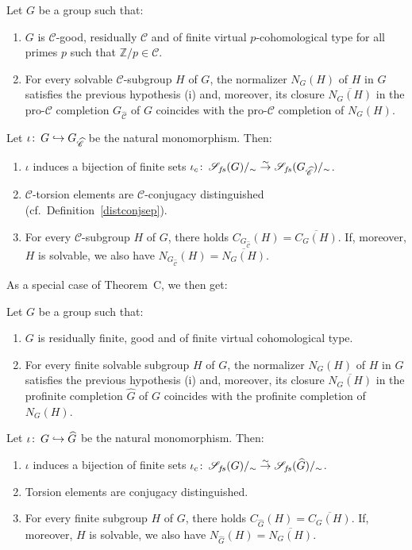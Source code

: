 \documentclass[12pt,twoside]{amsart}
\newcommand\Z{{\mathbb Z}}
\newcommand\hookra{\hookrightarrow}
\newcommand\sr{\stackrel}
\newcommand\ol{\overline}
\newcommand\cC{{\mathscr C}}
\newcommand\cS{{\mathscr S}}
\newcommand\hG{{\widehat{G}}}
\def\co{\colon\thinspace}
\def\wC{{\widehat{\cC}}}
\newenvironment{customtheorem}[1]
  {\renewcommand\theinnercustomthm{#1}\innercustomthm}
  {\endinnercustomthm}
\newenvironment{customcorollary}[1]
  {\renewcommand\theinnercustomcor{#1}\innercustomcor}
  {\endinnercustomcor}
\theoremstyle{definition}
\begin{document}
\begin{customtheorem}{C}Let $G$ be a group such that:
\begin{enumerate}
\item $G$ is $\cC$-good, residually $\cC$ and of finite virtual $p$-cohomological type for all primes $p$ such that $\Z/p\in\cC$.
\item For every solvable $\cC$-subgroup $H$ of $G$, the normalizer $N_G(H)$ of $H$ in $G$ satisfies the previous hypothesis (i)
and, moreover, its closure $\ol{N_G(H)}$ in the pro-$\cC$ completion $G_{\wC}$ of $G$ coincides with the pro-$\cC$
completion of $N_G(H)$.
\end{enumerate}
Let $\iota\co G\hookra G_{\wC}$ be the natural monomorphism. Then:
\begin{enumerate}
\item $\iota$ induces a bijection of finite sets $\iota_c\co\cS_{f\!s}(G)/_{\sim}\sr{\sim}{\to}\cS_{f\!s}(G_{\wC})/_{\sim}$. 
\item $\cC$-torsion elements are $\cC$-conjugacy distinguished (cf.\ Definition~\ref{distconjsep}).
\item For every $\cC$-subgroup $H$ of $G$, there holds $C_{G_\wC}(H)=\ol{C_G(H)}$. If, moreover, $H$ is solvable,
we also have $N_{G_\wC}(H)=\ol{N_G(H)}$.
\end{enumerate}
\end{customtheorem}

As a special case of Theorem~C, we then get:

\begin{customcorollary}{D}Let $G$ be a group such that:
\begin{enumerate}
\item $G$ is residually finite, good and of finite virtual cohomological type.
\item For every finite solvable subgroup $H$ of $G$, the normalizer $N_G(H)$ of $H$ in $G$ satisfies the previous hypothesis (i)
and, moreover, its closure $\ol{N_G(H)}$ in the profinite completion $\hG$ of $G$ coincides with the profinite completion of $N_G(H)$.
\end{enumerate}
Let $\iota\co G\hookra \hG$ be the natural monomorphism. Then:
\begin{enumerate}
\item $\iota$ induces a bijection of finite sets $\iota_c\co\cS_{f\!s}(G)/_{\sim}\sr{\sim}{\to}\cS_{f\!s}(\hG)/_{\sim}$.  
\item Torsion elements are conjugacy distinguished.
\item For every finite subgroup $H$ of $G$, there holds $C_{\hG}(H)=\ol{C_G(H)}$. If, moreover, $H$ is  solvable,
we also have $N_{\hG}(H)=\ol{N_G(H)}$.
\end{enumerate}
\end{customcorollary}
\end{document}

